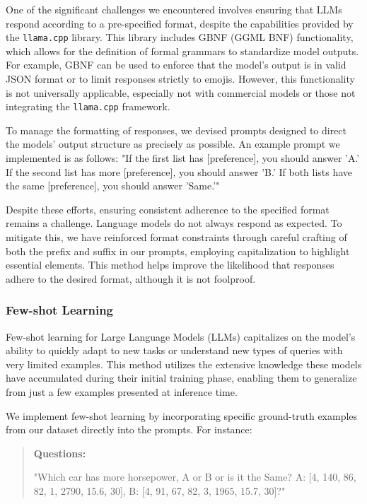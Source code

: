 \documentclass{ieeeaccess}
\newenvironment{Questions}{
    \begin{quote}
    \textbf{Questions:}
}{\end{quote}}
\begin{document}
One of the significant challenges we encountered involves ensuring that LLMs respond according to a pre-specified format, despite the capabilities provided by the \texttt{llama.cpp} library. This library includes GBNF (GGML BNF) functionality, which allows for the definition of formal grammars to standardize model outputs. For example, GBNF can be used to enforce that the model's output is in valid JSON format or to limit responses strictly to emojis\cite{llamacpp}. However, this functionality is not universally applicable, especially not with commercial models or those not integrating the \texttt{llama.cpp} framework.

To manage the formatting of responses, we devised prompts designed to direct the models' output structure as precisely as possible. An example prompt we implemented is as follows: "If the first list has [preference], you should answer 'A.' If the second list has more [preference], you should answer 'B.' If both lists have the same [preference], you should answer 'Same.'"

Despite these efforts, ensuring consistent adherence to the specified format remains a challenge. Language models do not always respond as expected. To mitigate this, we have reinforced format constraints through careful crafting of both the prefix and suffix in our prompts, employing capitalization to highlight essential elements. This method helps improve the likelihood that responses adhere to the desired format, although it is not foolproof.

\subsubsection{Few-shot Learning}

Few-shot learning for Large Language Models (LLMs) capitalizes on the model's ability to quickly adapt to new tasks or understand new types of queries with very limited examples. This method utilizes the extensive knowledge these models have accumulated during their initial training phase, enabling them to generalize from just a few examples presented at inference time\cite{brown2020language}.

We implement few-shot learning by incorporating specific ground-truth examples from our dataset directly into the prompts. For instance:

\begin{Questions}
"Which car has more horsepower, A or B or is it the Same? A: [4, 140, 86, 82, 1, 2790, 15.6, 30], B: [4, 91, 67, 82, 3, 1965, 15.7, 30]?"
\end{Questions}
\end{document}
